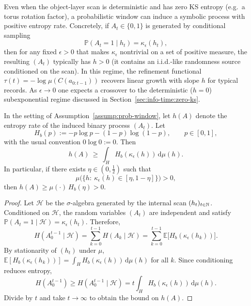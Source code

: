 \begin{remark}\label{rem:noise-positive-entropy}
Even when the object-layer scan is deterministic and has zero KS entropy (e.g.\ a torus rotation factor), a probabilistic window can induce a symbolic process with positive entropy rate. Concretely, if $A_t\in\{0,1\}$ is generated by conditional sampling
\[
\mathbb{P}(A_t=1\mid h_t)=\kappa_\epsilon(h_t),
\]
then for any fixed $\epsilon>0$ that makes $\kappa_\epsilon$ nontrivial on a set of positive measure, the resulting $(A_t)$ typically has $h>0$ (it contains an i.i.d.-like randomness source conditioned on the scan). In this regime, the refinement functional $\tau(t)=-\log\mu(C(a_{0:t-1}))$ recovers linear growth with slope $h$ for typical records. As $\epsilon\to 0$ one expects a crossover to the deterministic ($h=0$) subexponential regime discussed in Section~\ref{sec:info-time:zero-ks}.
\end{remark}

\begin{proposition}\label{prop:prob-window-positive-entropy}
In the setting of Assumption~\ref{assump:prob-window}, let $h(A)$ denote the entropy rate of the induced binary process $(A_t)$. Let
\[
H_b(p):=-p\log p-(1-p)\log(1-p),\qquad p\in[0,1],
\]
with the usual convention $0\log 0:=0$. Then
\[
h(A)\ \ge\ \int_H H_b(\kappa_\epsilon(h))\,\mathrm{d}\mu(h).
\]
In particular, if there exists $\eta\in(0,\tfrac12)$ such that
\[
\mu\bigl(\{h:\ \kappa_\epsilon(h)\in[\eta,1-\eta]\}\bigr)>0,
\]
then $h(A)\ge \mu(\cdot)\,H_b(\eta)>0$.
\end{proposition}

\begin{proof}
Let $\mathcal{H}$ be the $\sigma$-algebra generated by the internal scan $(h_t)_{t\in\mathbb{N}}$. Conditioned on $\mathcal{H}$, the random variables $(A_t)$ are independent and satisfy $\mathbb{P}(A_t=1\mid \mathcal{H})=\kappa_\epsilon(h_t)$. Therefore,
\[
H(A_0^{t-1}\mid \mathcal{H})=\sum_{k=0}^{t-1} H(A_k\mid \mathcal{H})
=\sum_{k=0}^{t-1} \mathbb{E}\bigl[H_b(\kappa_\epsilon(h_k))\bigr].
\]
By stationarity of $(h_t)$ under $\mu$, $\mathbb{E}[H_b(\kappa_\epsilon(h_k))]=\int_H H_b(\kappa_\epsilon(h))\,\mathrm{d}\mu(h)$ for all $k$. Since conditioning reduces entropy,
\[
H(A_0^{t-1})\ge H(A_0^{t-1}\mid \mathcal{H})=t\int_H H_b(\kappa_\epsilon(h))\,\mathrm{d}\mu(h).
\]
Divide by $t$ and take $t\to\infty$ to obtain the bound on $h(A)$.
\end{proof}


